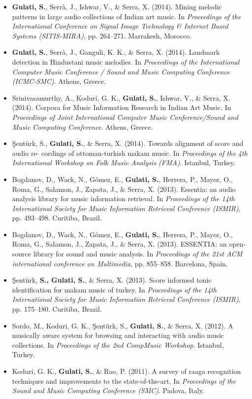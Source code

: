\begin{itemize}[leftmargin=*]
	\item \textbf{Gulati, S.},  Serr{\`a}, J., Ishwar, V., \& Serra, X. (2014). Mining melodic patterns in large audio collections of Indian art music. In \textit{Proceedings of the International Conference on Signal Image Technology \& Internet Based Systems (SITIS-MIRA)}, pp. 264–271. Marrakesh, Morocco.
	\item \textbf{Gulati, S.}, Serr{\`a}, J., Ganguli, K. K., \& Serra, X. (2014). Landmark detection in Hindustani music melodies. In \textit{Proceedings of the International Computer Music Conference / Sound and Music Computing Conference (ICMC-SMC)}. Athens, Greece. 
	\item Srinivasamurthy, A., Koduri, G. K., \textbf{Gulati, S.}, Ishwar, V., \& Serra, X. (2014). Corpora for Music Information Research in Indian Art Music. In \textit{Proceedings of Joint International Computer Music Conference/Sound and Music Computing Conference}. Athens, Greece. 
	\item \c{S}ent{\"u}rk, S., \textbf{Gulati, S.}, \& Serra, X. (2014). Towards alignment of score and audio re- cordings of ottoman-turkish makam music. In \textit{Proceedings of the 4th International Workshop on Folk Music Analysis (FMA)}. Istanbul, Turkey. 
	\item Bogdanov, D., Wack, N., G{\'o}mez, E., \textbf{Gulati, S.}, Herrera, P., Mayor, O., Roma, G., Salamon, J., Zapata, J., \& Serra, X. (2013). Essentia: an audio analysis library for music information retrieval. In \textit{Proceedings of the 14th International Society for Music Information Retrieval Conference (ISMIR)}, pp. 493–498. Curitiba, Brazil.
	\item Bogdanov, D., Wack, N., G{\'o}mez, E., \textbf{Gulati, S.}, Herrera, P., Mayor, O., Roma, G., Salamon, J., Zapata, J., \& Serra, X. (2013). ESSENTIA: an open-source library for sound and music analysis. In \textit{Proceedings of the 21st ACM international conference on Multimedia}, pp. 855–858. Barcelona, Spain.
	\item \c{S}ent{\"u}rk, \textbf{S., Gulati, S.}, \& Serra, X. (2013). Score informed tonic identification for makam music of turkey. In \textit{Proceedings of the 14th International Society for Music Information Retrieval Conference (ISMIR)}, pp. 175–180. Curitiba, Brazil.
	\item Sordo, M., Koduri, G. K., \c{S}ent{\"u}rk, S., \textbf{Gulati, S.}, \& Serra, X. (2012). A musically aware system for browsing and interacting with audio music collections. In \textit{Proceedings of the 2nd CompMusic Workshop}. Istanbul, Turkey.
	\item Koduri, G. K., \textbf{Gulati, S.}, \& Rao, P. (2011). A survey of raaga recognition techniques and improvements to the state-of-the-art. In \textit{Proceedings of the Sound and Music Computing Conference (SMC)}. Padova, Italy.
\end{itemize}
%

